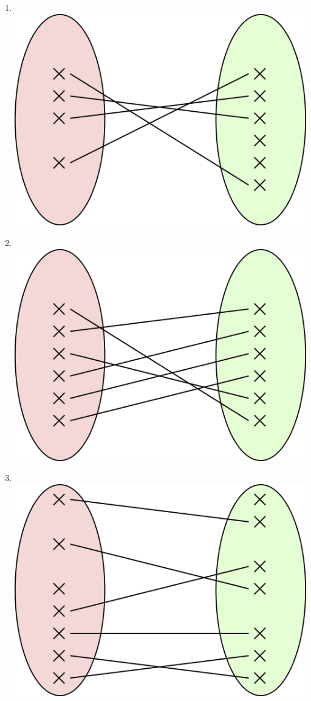 \documentclass[a4paper,12pt,french]{book}
\begin{document}
\begin{exercice}[]
\begin{multicols}{2}
\begin{enumerate}
	\item 	\ \\\includegraphics[width=\myw]{img/6.png}
	\item 	\ \\\includegraphics[width=\myw]{img/7.png}
	\item 	\ \\\includegraphics[width=\myw]{img/8.png}
\end{enumerate}
\end{multicols}


\end{exercice}
\end{document}
